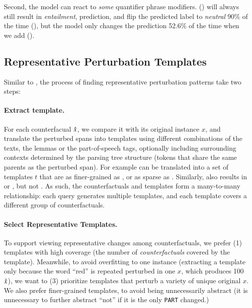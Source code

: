 Second, the model can react to \emph{some} quantifier phrase modifiers. 
 () will always still result in \emph{entailment}, prediction,  and  flip the predicted label to \emph{neutral} 90\% of the time (), but the model only changes the prediction 52.6\% of the time when we add  ().


\subsection{Representative Perturbation Templates}
\label{appendix:err_analysis_template}

Similar to \citet{wu2020tempura}, the process of finding representative perturbation patterns take two steps:

\paragraph{Extract template.}
For each counterfacual $\hat{x}$, we compare it with its original instance $x$, and translate the perturbed spans into templates using different combinations of the texts, the lemmas or the part-of-speech tags, optionally including surrounding contexts determined by the parsing tree structure (tokens that share the same parents as the perturbed span). 
For example  can be translated into a set of templates $t$ that are as finer-grained as , or as sparse as .
Similarly,  also results in  or , but not .
As such, the counterfactuals and templates form a many-to-many relationship: each query generates multiple templates, and each template covers a different group of counterfactuals.

\paragraph{Select Representative Templates.}
To support viewing representative changes among counterfactuals, we prefer (1) templates with high coverage (the number of
\emph{counterfactuals} covered by the template).
Meanwhile, to avoid overfitting to one instance (\eg extracting a template  only because the word ``red'' is repeated perturbed in one $x$, which produces 100 $\hat{x}$), we want to (3) prioritize templates that perturb a variety of unique original $x$.
We also prefer finer-grained templates, to avoid being unnecessarily abstract (\eg it is unnecessary to further abstract ``not'' if it is the only \texttt{PART} changed.)

